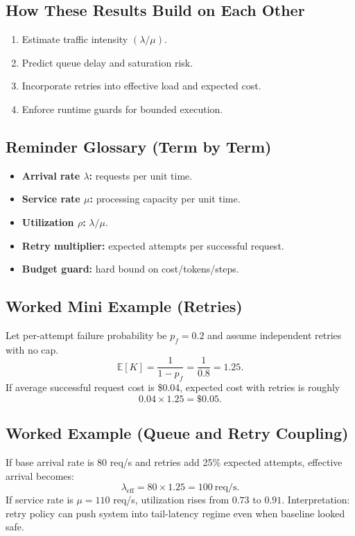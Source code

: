 \subsection*{How These Results Build on Each Other}
\begin{enumerate}[leftmargin=1.5em]
  \item Estimate traffic intensity $(\lambda/\mu)$.
  \item Predict queue delay and saturation risk.
  \item Incorporate retries into effective load and expected cost.
  \item Enforce runtime guards for bounded execution.
\end{enumerate}

\subsection*{Reminder Glossary (Term by Term)}
\begin{itemize}[leftmargin=1.5em]
  \item \textbf{Arrival rate $\lambda$:} requests per unit time.
  \item \textbf{Service rate $\mu$:} processing capacity per unit time.
  \item \textbf{Utilization $\rho$:} $\lambda/\mu$.
  \item \textbf{Retry multiplier:} expected attempts per successful request.
  \item \textbf{Budget guard:} hard bound on cost/tokens/steps.
\end{itemize}

\subsection*{Worked Mini Example (Retries)}
Let per-attempt failure probability be $p_f=0.2$ and assume independent retries with no cap.
\[
\mathbb{E}[K]=\frac{1}{1-p_f}=\frac{1}{0.8}=1.25.
\]
If average successful request cost is \$0.04, expected cost with retries is roughly
\[
0.04\times 1.25 = \$0.05.
\]

\subsection*{Worked Example (Queue and Retry Coupling)}
If base arrival rate is 80 req/s and retries add 25\% expected attempts, effective arrival becomes:
\[
\lambda_{\text{eff}} = 80 \times 1.25 = 100\ \text{req/s}.
\]
If service rate is $\mu=110$ req/s, utilization rises from $0.73$ to $0.91$.  
Interpretation: retry policy can push system into tail-latency regime even when baseline looked safe.

